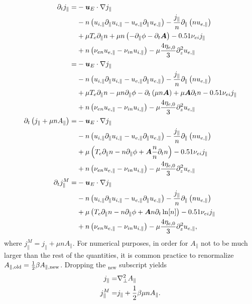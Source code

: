 \begin{align*}
 \partial_t j_\|
=&
- \boldsymbol{u}_E \cdot \nabla j_\|
    \\&
    - n \left( u_{i, \|}  \partial_\| u_{i,\|} - u_{e, \|} \partial_\| u_{e,\|} \right)
    - \frac{j_\|}{n}\partial_\|\left(n u_{e,\|} \right)
    \\&
    + \mu T_e\partial_\| n
    + \mu n\left(-\partial_\| \phi - \partial_t \boldsymbol{A}\right)
    - 0.51 \nu_{ei} j_\|
    \\ &
    + n \left(\nu_{e n}u_{e,\|}-\nu_{i n}u_{i,\|} \right)
    - \mu \frac{4\eta_{e,0}}{3} \partial_z^2 u_{e,\|}
 \\
=&
- \boldsymbol{u}_E \cdot \nabla j_\|
    \\&
    - n \left( u_{i, \|}  \partial_\| u_{i,\|} - u_{e, \|} \partial_\| u_{e,\|} \right)
    - \frac{j_\|}{n}\partial_\|\left(n u_{e,\|} \right)
    \\&
    + \mu T_e\partial_\| n
    - \mu n\partial_\| \phi
    - \partial_t\left(\mu n \boldsymbol{A}\right)
    + \mu\boldsymbol{A}\partial_t n
    - 0.51 \nu_{ei} j_\|
    \\ &
    + n \left(\nu_{e n}u_{e,\|}-\nu_{i n}u_{i,\|} \right)
    - \mu \frac{4\eta_{e,0}}{3} \partial_z^2 u_{e,\|}
 \\
 \partial_t \left(j_\|+ \mu n A_\| \right)
=&
- \boldsymbol{u}_E \cdot \nabla j_\|
    \\&
    - n \left( u_{i, \|}  \partial_\| u_{i,\|} - u_{e, \|} \partial_\| u_{e,\|} \right)
    - \frac{j_\|}{n}\partial_\|\left(n u_{e,\|} \right)
    \\&
    + \mu
    \left( T_e\partial_\| n
    -  n\partial_\| \phi
    + \boldsymbol{A}\frac{n}{n}\partial_t n
    \right)
    - 0.51 \nu_{ei} j_\|
    \\ &
    + n \left(\nu_{e n}u_{e,\|}-\nu_{i n}u_{i,\|} \right)
    - \mu \frac{4\eta_{e,0}}{3} \partial_z^2 u_{e,\|}
 \\
 \partial_t j^M_\|
=&
- \boldsymbol{u}_E \cdot \nabla j_\|
    \\&
    - n \left( u_{i, \|}  \partial_\| u_{i,\|} - u_{e, \|} \partial_\| u_{e,\|} \right)
    - \frac{j_\|}{n}\partial_\|\left(n u_{e,\|} \right)
    \\&
    + \mu
    \left( T_e\partial_\| n
    -  n\partial_\| \phi
    + \boldsymbol{A}n\partial_t \ln[n]
    \right)
    - 0.51 \nu_{ei} j_\|
    \\ &
    + n \left(\nu_{e n}u_{e,\|}-\nu_{i n}u_{i,\|} \right)
    - \mu \frac{4\eta_{e,0}}{3} \partial_z^2 u_{e,\|},
\end{align*}
%
where $j^M_\| = j_\|+ \mu n A_\|$.
%
For numerical purposes, in order for $A_\|$ not to be much larger than the rest of the quantities, it is common practice to renormalize $A_{\|, \text{old}} = \frac{1}{2}\beta A_{\|, \text{new}}$.
Dropping the $_{\text{new}}$ subscript yields %
%
\begin{align*}
    j_\| =& \nabla^2_\perp A_\|\\
    j^M_\| =& j_\|+ \frac{1}{2}\beta\mu n A_\|.
\end{align*}
